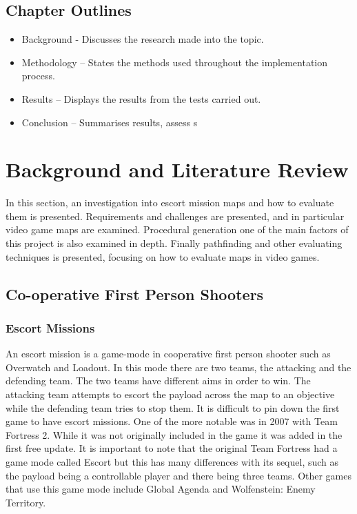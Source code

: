 \documentclass{article}
\begin{document}
\subsection{Chapter Outlines}
\begin{itemize}
	\item Background - Discusses the research made into the topic.
	\item Methodology – States the methods used throughout the implementation process.
	\item Results – Displays the results from the tests carried out.
	\item Conclusion – Summarises results, assess s	
\end{itemize}
\newpage
\section{Background and Literature Review}
In this section, an investigation into escort mission maps and how to evaluate them is presented. Requirements and challenges are presented, and in particular video game maps are examined. Procedural generation one of the main factors of this project is also examined in depth. Finally pathfinding and other evaluating techniques is presented, focusing on how to evaluate maps in video games. 
\subsection{Co-operative First Person Shooters}

\subsubsection{Escort Missions}
An escort mission is a game-mode in cooperative first person shooter such as Overwatch and Loadout. In this mode there are two teams, the attacking and the defending team. The two teams have different aims in order to win. The attacking team attempts to escort the payload across the map to an objective while the defending team tries to stop them. It is difficult to pin down the first game to have escort missions. One of the more notable was in 2007 with Team Fortress 2. While it was not originally included in the game it was added in the first free update. It is important to note that the original Team Fortress had a game mode called Escort but this has many differences with its sequel, such as the payload being a controllable player and there being three teams. Other games that use this game mode include Global Agenda and Wolfenstein: Enemy Territory.    
\end{document}
